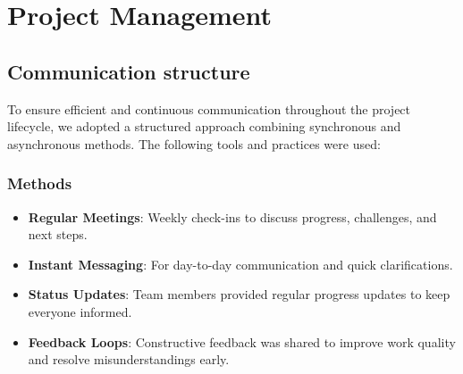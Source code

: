 \chapter{Project Management}
\label{app:annexD}

\section*{Communication structure}

To ensure efficient and continuous communication throughout the project lifecycle, we adopted a structured approach combining synchronous and asynchronous methods. The following tools and practices were used:

\subsection*{Methods}
\begin{itemize}
    \item \textbf{Regular Meetings}: Weekly check-ins to discuss progress, challenges, and next steps.
    \item \textbf{Instant Messaging}: For day-to-day communication and quick clarifications.
    \item \textbf{Status Updates}: Team members provided regular progress updates to keep everyone informed.
    \item \textbf{Feedback Loops}: Constructive feedback was shared to improve work quality and resolve misunderstandings early.
\end{itemize}

